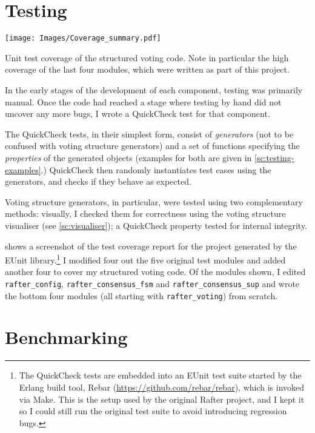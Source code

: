 \documentclass[12pt,chapterprefix=true,toc=bibliography,numbers=noendperiod,
               footnotes=multiple,twoside]{scrreprt}
\begin{document}
\section{Testing}

\begin{table}[bt]
    \centering
    \texttt{[image: Images/Coverage\_summary.pdf]}
    \caption[Unit test coverage]{Unit test coverage of the structured voting code. Note in particular the high coverage of the last four modules, which were written as part of this project.}
    \label{tab:coverage}
\end{table}

In the early stages of the development of each component, testing was primarily manual. Once the code had reached a stage where testing by hand did not uncover any more bugs, I wrote a QuickCheck test for that component.

The QuickCheck tests, in their simplest form, consist of \emph{generators} (not to be confused with voting structure generators) and a set of functions specifying the \emph{properties} of the generated objects (examples for both are given in \cref{sc:testing-examples}.) QuickCheck then randomly instantiates test cases using the generators, and checks if they behave as expected.

Voting structure generators, in particular, were tested using two complementary methods: visually, I checked them for correctness using the voting structure visualiser (see \cref{sc:visualiser}); a QuickCheck property tested for internal integrity.

 shows a screenshot of the test coverage report for the project generated by the EUnit library.\footnote{The QuickCheck tests are embedded into an EUnit test suite started by the Erlang build tool, Rebar (\url{https://github.com/rebar/rebar}), which is invoked via Make. This is the setup used by the original Rafter project, and I kept it so I could still run the original test suite to avoid introducing regression bugs.} I modified four out the five original test modules and added another four to cover my structured voting code. Of the modules shown, I edited \texttt{rafter\_config}, \texttt{rafter\_consensus\_fsm} and \texttt{rafter\_consensus\_sup} and wrote the bottom four modules (all starting with \texttt{rafter\_voting}) from scratch.

\section{Benchmarking}
\end{document}
